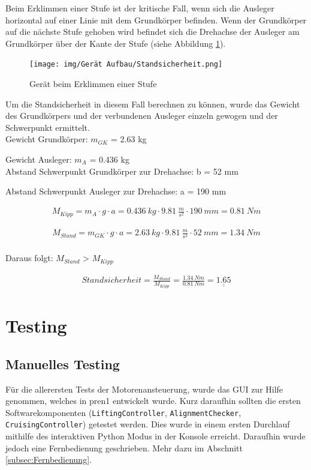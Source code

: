 Beim Erklimmen einer Stufe ist der kritische Fall, wenn sich die Ausleger horizontal auf einer Linie mit dem Grundkörper befinden. Wenn der Grundkörper auf die nächste Stufe gehoben wird befindet sich die Drehachse der Ausleger am Grundkörper über der Kante der Stufe (siehe Abbildung \ref{fig:Erklimmen}).

\begin{figure}[h]
  \texttt{[image: img/Gerät Aufbau/Standsicherheit.png]}
  \centering
  \caption{Gerät beim Erklimmen einer Stufe}
  \label{fig:Erklimmen}
\end{figure}

Um die Standsicherheit in diesem Fall berechnen zu können, wurde das Gewicht des Grundkörpers und der verbundenen Ausleger einzeln gewogen und der Schwerpunkt ermittelt.\\

Gewicht Grundkörper: $m_{GK}$ = 2.63 kg

Gewicht Ausleger: $m_{A}$ = 0.436 kg\\

Abstand Schwerpunkt Grundkörper zur Drehachse: b = 52 mm

Abstand Schwerpunkt Ausleger zur Drehachse: a = 190 mm

\newpage

\begin{align*}
M_{Kipp} = m_{A} \cdot g \cdot a = 0.436\ kg \cdot 9.81\ \frac{m}{s^2} \cdot 190\ mm = 0.81\ Nm
\end{align*}

\begin{align*}
M_{Stand} = m_{GK} \cdot g \cdot a = 2.63\ kg \cdot 9.81\ \frac{m}{s^2} \cdot 52\ mm = 1.34\ Nm
\end{align*}\\

Daraus folgt: $M_{Stand}$ > $M_{Kipp}$

\begin{align*}
Standsicherheit = \frac{M_{Stand}}{M_{Kipp}} = \frac{1.34\ Nm}{0.81\ Nm} = \underline{\underline{1.65}}
\end{align*}







\newpage

\section{Testing}

\subsection{Manuelles Testing}
Für die allerersten Tests der Motorenansteuerung, wurde das GUI zur Hilfe genommen, welches in \acrshort{pren1} entwickelt wurde. Kurz daraufhin sollten die ersten Softwarekomponenten (\texttt{LiftingController}, \texttt{AlignmentChecker}, \texttt{CruisingController}) getestet werden. Dies wurde in einem ersten Durchlauf mithilfe des interaktiven Python Modus in der Konsole erreicht. Daraufhin wurde jedoch eine Fernbedienung geschrieben. Mehr dazu im Abschnitt \ref{subsec:Fernbedienung}.


